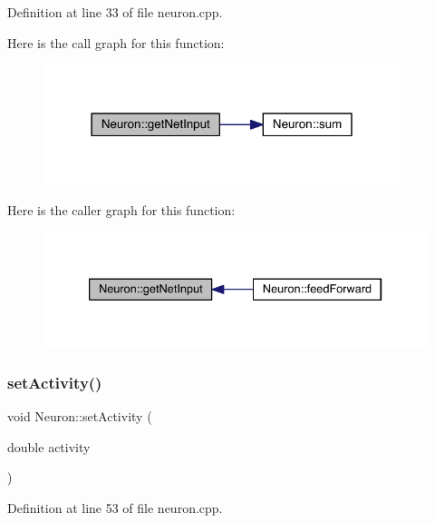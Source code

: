 Definition at line 33 of file neuron.\+cpp.

Here is the call graph for this function\+:\nopagebreak
\begin{figure}[H]
\begin{center}
\leavevmode
\includegraphics[width=295pt]{class_neuron_a5a84194bf3f93051d3d9f02e9146f1d4_cgraph}
\end{center}
\end{figure}
Here is the caller graph for this function\+:\nopagebreak
\begin{figure}[H]
\begin{center}
\leavevmode
\includegraphics[width=333pt]{class_neuron_a5a84194bf3f93051d3d9f02e9146f1d4_icgraph}
\end{center}
\end{figure}
\mbox{\label{class_neuron_a53bda59e2ab1f8342a1af503a1652cdd}} 
\subsubsection{\texorpdfstring{set\+Activity()}{setActivity()}}
{\footnotesize\ttfamily void Neuron\+::set\+Activity (\begin{DoxyParamCaption}\item[{double}]{activity }\end{DoxyParamCaption})}



Definition at line 53 of file neuron.\+cpp.

\mbox{\label{class_neuron_a24893b0c92f073daae4c697b35e395f5}} 
